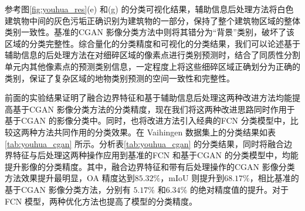 参考图\ref{fig:youhua_res}(e) 和(g) 的分类可视化结果，辅助信息后处理方法将白色建筑物中间的灰色污垢正确识别为建筑物的一部分，保持了整个建筑物区域的整体类别一致性。基准的CGAN 影像分类方法中则将其错分为“背景”类别，破坏了该区域的分类完整性。综合量化的分类精度和可视化的分类结果，我们可以论述基于辅助信息的后处理方法在对细碎区域的像素点进行类别预测时，结合了同质性分割单元内其他像素点的预测类别信息，一定程度上将这些细碎区域正确划分为正确的类别，保证了复杂区域的地物类别预测的空间一致性和完整性。

\begin{table}[!h]
    \centering
    \caption{两种优化方法共同作用对影像分类的影响}\label{tab:youhua_cgan}
\end{table}

前面的实验结果证明了融合边界特征和基于辅助信息后处理这两种改进方法均能提高基于CGAN 影像分类方法的分类精度，现在我们将这两种改进思路同时作用于基于CGAN 的影像分类中。同时，也将改进方法引入经典的FCN 分类模型中，比较这两种方法共同作用的分类效果。在 Vaihingen 数据集上的分类结果如表\ref{tab:youhua_cgan} 所示。分析表\ref{tab:youhua_cgan} 的分类结果，同时将融合边界特征与后处理这两种操作应用到基准的FCN 和基于CGAN 的分类模型中，均能提升影像的分类精度。其中，融合边界特征和带有后处理操作的CGAN 影像分类方法效果提升最明显，OA 精度达到$85.32\%$，mIoU 则提升到$68.17\%$，相比基准的基于CGAN 影像分类方法，分别有 $5.17\%$ 和$6.34\%$ 的绝对精度值的提升。对于FCN 模型，两种优化方法也提高了模型的分类精度。

